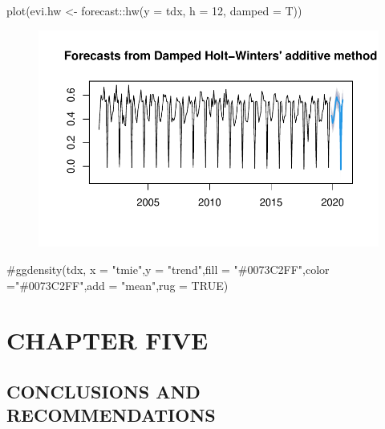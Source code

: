 \documentclass[
  letterpaper,
  DIV=11,
  numbers=noendperiod]{scrartcl}
\newenvironment{Shaded}{\begin{snugshade}}{\end{snugshade}}
\newcommand{\AttributeTok}[1]{\textcolor[rgb]{0.40,0.45,0.13}{#1}}
\newcommand{\CommentTok}[1]{\textcolor[rgb]{0.37,0.37,0.37}{#1}}
\newcommand{\DecValTok}[1]{\textcolor[rgb]{0.68,0.00,0.00}{#1}}
\newcommand{\FunctionTok}[1]{\textcolor[rgb]{0.28,0.35,0.67}{#1}}
\newcommand{\NormalTok}[1]{\textcolor[rgb]{0.00,0.23,0.31}{#1}}
\newcommand{\OtherTok}[1]{\textcolor[rgb]{0.00,0.23,0.31}{#1}}
\newcommand{\SpecialCharTok}[1]{\textcolor[rgb]{0.37,0.37,0.37}{#1}}
\begin{document}
\begin{Shaded}
\begin{Highlighting}[]
\FunctionTok{plot}\NormalTok{(evi.hw }\OtherTok{\textless{}{-}}\NormalTok{ forecast}\SpecialCharTok{::}\FunctionTok{hw}\NormalTok{(}\AttributeTok{y =}\NormalTok{ tdx, }\AttributeTok{h =} \DecValTok{12}\NormalTok{, }\AttributeTok{damped =}\NormalTok{ T))}
\end{Highlighting}
\end{Shaded}

\begin{figure}[H]

{\centering \includegraphics{Quarto_files/figure-pdf/unnamed-chunk-22-1.pdf}

}

\end{figure}

\begin{Shaded}
\begin{Highlighting}[]
\CommentTok{\#ggdensity(tdx, x = "tmie",y = "trend",fill = "\#0073C2FF",color ="\#0073C2FF",add = "mean",rug = TRUE)}
\end{Highlighting}
\end{Shaded}

\hypertarget{chapter-five}{%
\section{CHAPTER FIVE}\label{chapter-five}}

\hypertarget{conclusions-and-recommendations}{%
\subsection{CONCLUSIONS AND
RECOMMENDATIONS}\label{conclusions-and-recommendations}}
\end{document}
